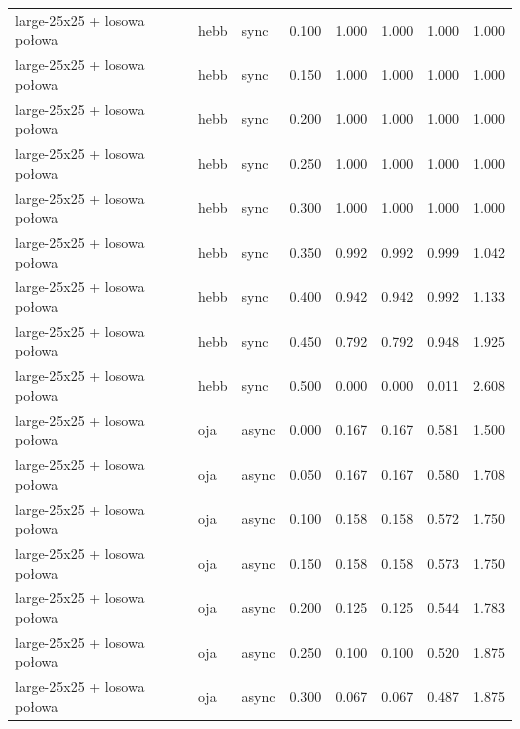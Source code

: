 \begin{tabular}{lllrrrrr}
large-25x25 + losowa połowa & hebb & sync & 0.100 & 1.000 & 1.000 & 1.000 & 1.000 \\

large-25x25 + losowa połowa & hebb & sync & 0.150 & 1.000 & 1.000 & 1.000 & 1.000 \\

large-25x25 + losowa połowa & hebb & sync & 0.200 & 1.000 & 1.000 & 1.000 & 1.000 \\

large-25x25 + losowa połowa & hebb & sync & 0.250 & 1.000 & 1.000 & 1.000 & 1.000 \\

large-25x25 + losowa połowa & hebb & sync & 0.300 & 1.000 & 1.000 & 1.000 & 1.000 \\

large-25x25 + losowa połowa & hebb & sync & 0.350 & 0.992 & 0.992 & 0.999 & 1.042 \\

large-25x25 + losowa połowa & hebb & sync & 0.400 & 0.942 & 0.942 & 0.992 & 1.133 \\

large-25x25 + losowa połowa & hebb & sync & 0.450 & 0.792 & 0.792 & 0.948 & 1.925 \\

large-25x25 + losowa połowa & hebb & sync & 0.500 & 0.000 & 0.000 & 0.011 & 2.608 \\

large-25x25 + losowa połowa & oja & async & 0.000 & 0.167 & 0.167 & 0.581 & 1.500 \\

large-25x25 + losowa połowa & oja & async & 0.050 & 0.167 & 0.167 & 0.580 & 1.708 \\

large-25x25 + losowa połowa & oja & async & 0.100 & 0.158 & 0.158 & 0.572 & 1.750 \\

large-25x25 + losowa połowa & oja & async & 0.150 & 0.158 & 0.158 & 0.573 & 1.750 \\

large-25x25 + losowa połowa & oja & async & 0.200 & 0.125 & 0.125 & 0.544 & 1.783 \\

large-25x25 + losowa połowa & oja & async & 0.250 & 0.100 & 0.100 & 0.520 & 1.875 \\

large-25x25 + losowa połowa & oja & async & 0.300 & 0.067 & 0.067 & 0.487 & 1.875 \\


\end{tabular}
